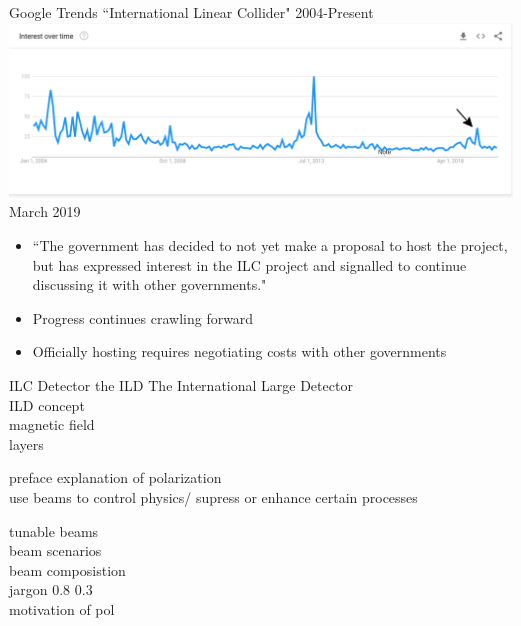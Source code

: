 \documentclass[10pt]{beamer}
\begin{document}
\begin{frame}
Google Trends ``International Linear Collider" 2004-Present
\includegraphics[scale=0.25]{timeline5.png}\\
March 2019
\begin{itemize}
\item ``The government has decided to not yet make a proposal to host the project, but has expressed interest in the ILC project and signalled to continue discussing it with other governments."
\item Progress continues crawling forward
\item Officially hosting requires negotiating costs with other governments
\end{itemize}
\end{frame}

\begin{frame}{ILC Detector the ILD  }
The International Large Detector\\
ILD concept\\
magnetic field\\
layers\\
\end{frame}

\begin{frame}{preface }
explanation of polarization \\
use beams to control physics/ supress or enhance certain processes

tunable beams\\
beam scenarios\\
beam composistion\\
jargon 0.8 0.3\\
motivation of pol\\

\end{frame}
\end{document}
